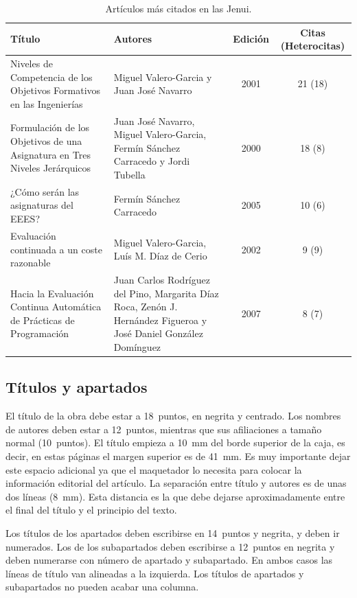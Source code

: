 \documentclass[twocolumn,twoside,a4paper, 10pt]{article}
\begin{document}
\begin{table}
	\begin{center}
	\begin{tabular}{p{5.2cm}p{4.5cm}cc}
		\textbf{Título} & \textbf{Autores} & \textbf{Edición} & 
		\textbf{Citas (Heterocitas)}\\\hline
		Niveles de Competencia de los Objetivos Formativos en las 
		Ingenierías & Miguel Valero-Garcia y Juan José Navarro & 2001 
		& 21 (18) \\\hline
		Formulación de los Objetivos de una Asignatura en Tres Niveles
		Jerárquicos & Juan José Navarro, Miguel Valero-Garcia, Fermín
		Sánchez Carracedo y Jordi Tubella & 2000 & 18 (8) \\\hline
		¿Cómo serán las asignaturas del EEES? & Fermín Sánchez
		Carracedo & 2005 & 10 (6) \\\hline
		Evaluación continuada a un coste razonable & Miguel
		Valero-Garcia, Luís M. Díaz de Cerio & 2002 & 9 (9) \\\hline
		Hacia la Evaluación Continua Automática de Prácticas de
		Programación & Juan Carlos Rodríguez del Pino, Margarita Díaz
		Roca, Zenón J. Hernández Figueroa y José Daniel González
		Domínguez & 2007 & 8 (7) 
	\end{tabular}
	\end{center}
	\caption{\label{tab:mascit}Artículos más citados en las Jenui.}
\end{table}

\subsection{Títulos y apartados}

El título de la obra debe estar a 18~puntos, en negrita y centrado.
Los nombres de autores deben estar a 12~puntos, mientras que sus
afiliaciones a tamaño normal (10~puntos).  El título empieza a 10~mm
del borde superior de la caja, es decir, en estas páginas el margen
superior es de 41~mm. Es muy importante dejar este espacio adicional 
ya que el maquetador lo necesita para colocar la información 
editorial del artículo.  La separación entre título y autores es de unas
dos líneas (8~mm).  Esta distancia es la que debe dejarse
aproximadamente entre el final del título y el principio del texto. 

Los títulos de los apartados deben escribirse en 14~puntos y negrita, y 
deben ir numerados. Los de los subapartados deben escribirse a 12~puntos 
en negrita y deben numerarse con número de apartado y 
subapartado. En ambos casos las líneas de título van alineadas a la 
izquierda. Los títulos de apartados y subapartados no pueden acabar 
una columna.
\end{document}
